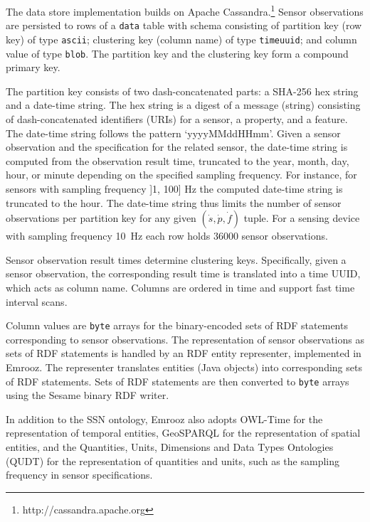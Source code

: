 \documentclass[preprint,12pt,authoryear]{elsarticle}
\begin{document}
The data store implementation builds on Apache Cassandra.\footnote{http://cassandra.apache.org} Sensor observations are persisted to rows of a \texttt{data} table with schema consisting of partition key (row key) of type \texttt{ascii}; clustering key (column name) of type \texttt{timeuuid}; and column value of type \texttt{blob}. The partition key and the clustering key form a compound primary key.

The partition key consists of two dash-concatenated parts: a SHA-256 hex string and a date-time string. The hex string is a digest of a message (string) consisting of dash-concatenated identifiers (URIs) for a sensor, a property, and a feature. The date-time string follows the pattern `yyyyMMddHHmm'. Given a sensor observation and the specification for the related sensor, the date-time string is computed from the observation result time, truncated to the year, month, day, hour, or minute depending on the specified sampling frequency. For instance, for sensors with sampling frequency ]1, 100] \si{\hertz} the computed date-time string is truncated to the hour. The date-time string thus limits the number of sensor observations per partition key for any given $(\dot{s}, \dot{p}, \dot{f})$ tuple. For a sensing device with sampling frequency \SI{10}{\hertz} each row holds 36000 sensor observations. 

Sensor observation result times determine clustering keys. Specifically, given a sensor observation, the corresponding result time is translated into a time UUID, which acts as column name. Columns are ordered in time and support fast time interval scans.

Column values are \texttt{byte} arrays for the binary-encoded sets of RDF statements corresponding to sensor observations. The representation of sensor observations as sets of RDF statements is handled by an RDF entity representer, implemented in Emrooz. The representer translates entities (Java objects) into corresponding sets of RDF statements. Sets of RDF statements are then converted to \texttt{byte} arrays using the Sesame binary RDF writer.

In addition to the SSN ontology, Emrooz also adopts OWL-Time \cite{hobbs06time} for the representation of temporal entities, GeoSPARQL \cite{perry12geosparql} for the representation of spatial entities, and the Quantities, Units, Dimensions and Data Types Ontologies (QUDT) \cite{hodgson14qudt} for the representation of quantities and units, such as the sampling frequency in sensor specifications.
\end{document}
